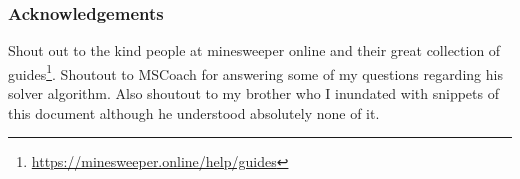 \subsubsection*{Acknowledgements}

Shout out to the kind people at minesweeper online and their great collection of guides\footnote{\url{https://minesweeper.online/help/guides}}. Shoutout to MSCoach for answering some of my questions regarding his solver algorithm. Also shoutout to my brother who I inundated with snippets of this document although he understood absolutely none of it.\\
